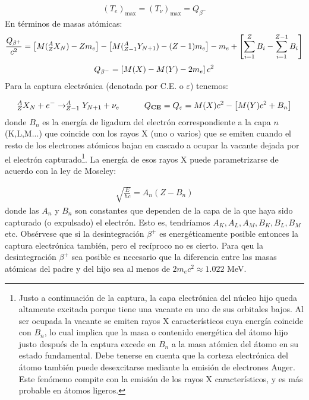 \begin{eqnarray}
	(T_e)_{\max} = (T_\nu)_{\max} = Q_{\beta^-}
\end{eqnarray}
En términos de masas atómicas:
\begin{eqnarray}
	\frac{Q_{\beta^+}}{c^2} = \left[ M(^A_ZX_N) - Zm_e \right] - \left[ M(_{Z-1}^A Y_ {N+1})-(Z-1)m_e \right]  - m_e + \left[ \sum_{i=1}^{Z} B_i - \sum_{i=1}^{Z-1} B_i \right]
\end{eqnarray}
\begin{eqnarray}
	Q_ {\beta^-} = \left[ M(X)-M(Y)-2m_e \right] c^2 
\end{eqnarray}
Para la captura electrónica (denotada por C.E. o $\varepsilon$) tenemos:

\begin{equation}
	^A_ZX_N + e^- \rightarrow ^A_{Z-1} Y_{N+1} + \nu_e \quad \quad \quad Q_{\textbf{CE}} = Q_\varepsilon = M(X) c^2 - \left[ M(Y)c^2+ B_n \right]
\end{equation}
donde $B_n$ es la energía de ligadura del electrón correspondiente a la capa $n$ (K,L,M...) que coincide con los rayos X (uno o varios) que se emiten cuando el resto de los electrones atómicos bajan en cascado a ocupar la vacante dejada por el electrón capturado\footnote{Justo a continuación de la captura, la capa electrónica del núcleo hijo queda altamente excitada porque tiene una vacante en uno de sus orbitales bajos. Al ser ocupada la vacante se emiten rayos X característicos cuya energía coincide con $B_n$, lo cual implica que la masa o contenido energética del átomo hijo justo después de la captura excede en $B_n$ a la masa atómica del átomo en su estado fundamental. Debe tenerse en cuenta que la corteza electrónica del átomo también puede desexcitarse mediante la emisión de electrones Auger. Este fenómeno compite con la emisión de los rayos X característicos, y es más probable en átomos ligeros.}. La energía de esos rayos X puede parametrizarse de acuerdo con la ley de Moseley:

\begin{eqnarray}
	\sqrt{\frac{E}{hc}} = A_n (Z-B_n)
\end{eqnarray}	
donde las $A_n$ y $B_n$ son constantes que dependen de la capa de la que haya sido capturado (o expulsado) el electrón. Esto es, tendríamos $A_K,A_L,A_M,B_K,B_L,B_M$ etc. Obsérvese que si la desintegración $\beta^+$ es energéticamente posible entonces la captura electrónica también, pero el recíproco no es cierto. Para qeu la desintegración $\beta^+$ sea posible es necesario que la diferencia entre las masas atómicas del padre y del hijo sea al menos de $2m_e c^2 \approx 1.022$ MeV. 

